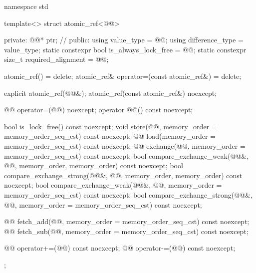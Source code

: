 \begin{codeblock}
namespace std {
  template<> struct atomic_ref<@@> {
  private:
    @@* ptr;  // \expos
  public:
    using value_type = @@;
    using difference_type = value_type;
    static constexpr bool is_always_lock_free = @@;
    static constexpr size_t required_alignment = @@;

    atomic_ref() = delete;
    atomic_ref& operator=(const atomic_ref&) = delete;

    explicit atomic_ref(@@&);
    atomic_ref(const atomic_ref&) noexcept;

    @@ operator=(@@) noexcept;
    operator @@() const noexcept;

    bool is_lock_free() const noexcept;
    void store(@@, memory_order = memory_order_seq_cst) const noexcept;
    @@ load(memory_order = memory_order_seq_cst) const noexcept;
    @@ exchange(@@,
                            memory_order = memory_order_seq_cst) const noexcept;
    bool compare_exchange_weak(@@&, @@,
                               memory_order, memory_order) const noexcept;
    bool compare_exchange_strong(@@&, @@,
                                 memory_order, memory_order) const noexcept;
    bool compare_exchange_weak(@@&, @@,
                               memory_order = memory_order_seq_cst) const noexcept;
    bool compare_exchange_strong(@@&, @@,
                                 memory_order = memory_order_seq_cst) const noexcept;

    @@ fetch_add(@@,
                             memory_order = memory_order_seq_cst) const noexcept;
    @@ fetch_sub(@@,
                             memory_order = memory_order_seq_cst) const noexcept;

    @@ operator+=(@@) const noexcept;
    @@ operator-=(@@) const noexcept;
  };
}
\end{codeblock}

